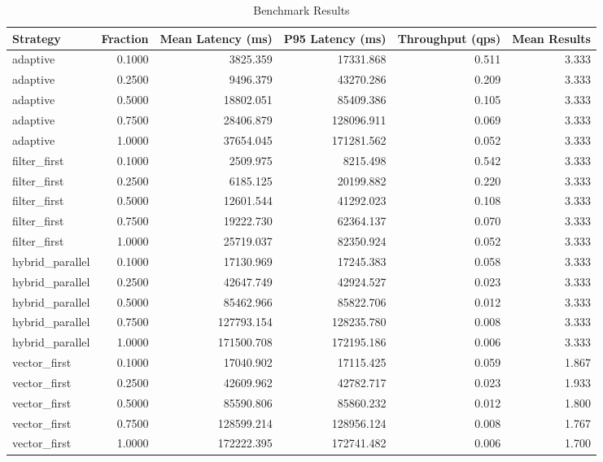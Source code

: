 \begin{table}[ht]
\centering
\begin{tabular}{lrrrrr}
\hline
Strategy & Fraction & Mean Latency (ms) & P95 Latency (ms) & Throughput (qps) & Mean Results \\
\hline
adaptive & 0.1000 & 3825.359 & 17331.868 & 0.511 & 3.333 \\
adaptive & 0.2500 & 9496.379 & 43270.286 & 0.209 & 3.333 \\
adaptive & 0.5000 & 18802.051 & 85409.386 & 0.105 & 3.333 \\
adaptive & 0.7500 & 28406.879 & 128096.911 & 0.069 & 3.333 \\
adaptive & 1.0000 & 37654.045 & 171281.562 & 0.052 & 3.333 \\
filter_first & 0.1000 & 2509.975 & 8215.498 & 0.542 & 3.333 \\
filter_first & 0.2500 & 6185.125 & 20199.882 & 0.220 & 3.333 \\
filter_first & 0.5000 & 12601.544 & 41292.023 & 0.108 & 3.333 \\
filter_first & 0.7500 & 19222.730 & 62364.137 & 0.070 & 3.333 \\
filter_first & 1.0000 & 25719.037 & 82350.924 & 0.052 & 3.333 \\
hybrid_parallel & 0.1000 & 17130.969 & 17245.383 & 0.058 & 3.333 \\
hybrid_parallel & 0.2500 & 42647.749 & 42924.527 & 0.023 & 3.333 \\
hybrid_parallel & 0.5000 & 85462.966 & 85822.706 & 0.012 & 3.333 \\
hybrid_parallel & 0.7500 & 127793.154 & 128235.780 & 0.008 & 3.333 \\
hybrid_parallel & 1.0000 & 171500.708 & 172195.186 & 0.006 & 3.333 \\
vector_first & 0.1000 & 17040.902 & 17115.425 & 0.059 & 1.867 \\
vector_first & 0.2500 & 42609.962 & 42782.717 & 0.023 & 1.933 \\
vector_first & 0.5000 & 85590.806 & 85860.232 & 0.012 & 1.800 \\
vector_first & 0.7500 & 128599.214 & 128956.124 & 0.008 & 1.767 \\
vector_first & 1.0000 & 172222.395 & 172741.482 & 0.006 & 1.700 \\
\hline
\end{tabular}
\caption{Benchmark Results}
\end{table}